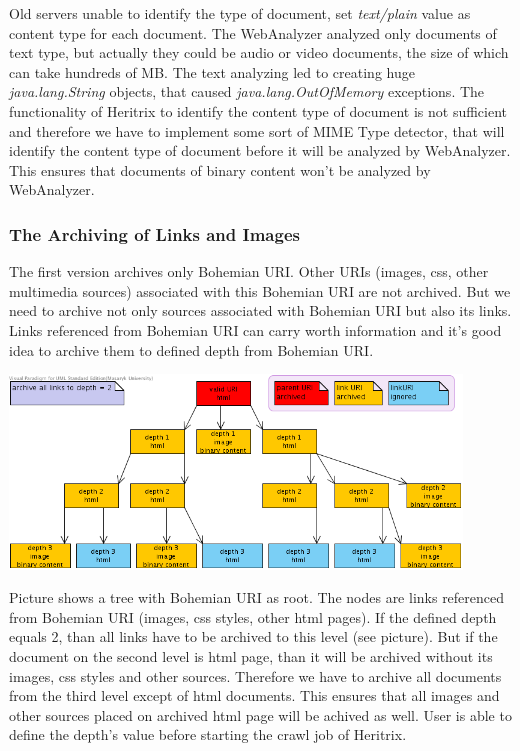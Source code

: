 \documentclass[11pt,a4paper]{article}
\begin{document}
Old servers unable to identify the type of document, set \emph{text/plain} value as content type for each document. The WebAnalyzer analyzed only documents of text type, but actually they could be audio or video documents, the size of which can take hundreds of MB. The text analyzing led to creating huge \emph{java.lang.String} objects, that caused \emph{java.lang.OutOfMemory} exceptions. The functionality of Heritrix to identify the content type of document is not sufficient and therefore we have to implement some sort of MIME Type detector, that will identify the content type of document before it will be analyzed by WebAnalyzer. This ensures that documents of binary content won't be analyzed by WebAnalyzer.

\subsubsection{The Archiving of Links and Images}
\label{aolai}
The first version archives only Bohemian URI. Other URIs (images, css, other multimedia sources) associated with this Bohemian URI are not archived. But we need to archive not only sources associated with Bohemian URI but also its links. Links referenced from Bohemian URI can carry worth information and it's good idea to archive them to defined depth from Bohemian URI.

\begin{center}
\includegraphics[width=120mm]{depth.png}
\end{center}

Picture shows a tree with Bohemian URI as root. The nodes are links referenced from Bohemian URI (images, css styles, other html pages). If the defined depth equals 2, than all links have to be archived to this level (see picture). But if the document on the second level is html page, than it will be archived without its images, css styles and other sources. Therefore we have to archive all documents from the third level except of html documents. This ensures that all images and other sources placed on archived html page will be achived as well. User is able to define the depth's value before starting the crawl job of Heritrix.
\end{document}
